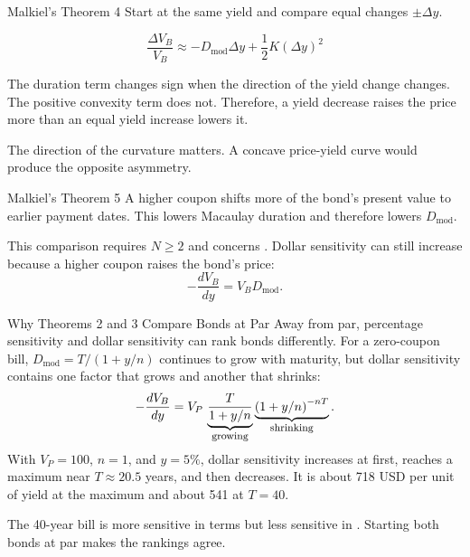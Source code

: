 \documentclass[aspectratio=169,11pt]{beamer}
\begin{document}
\begin{frame}{Malkiel's Theorem 4}
  \vspace{0.5em}
  Start at the same yield and compare equal changes $\pm\Delta y$.

  \vspace{0.5em}
  \[
    \frac{\Delta V_B}{V_B}\approx
    -D_{\mathrm{mod}}\Delta y+\frac{1}{2}K(\Delta y)^2
  \]

  \vspace{0.5em}
  The duration term changes sign when the direction of the yield change changes.
  The positive convexity term does not. Therefore, a yield decrease raises the
  price more than an equal yield increase lowers it.

  \vspace{0.5em}
  The direction of the curvature matters. A concave price-yield curve would
  produce the opposite asymmetry.
\end{frame}

\begin{frame}{Malkiel's Theorem 5}
  \vspace{0.5em}
  A higher coupon shifts more of the bond's present value to earlier payment
  dates. This lowers Macaulay duration and therefore lowers
  $D_{\mathrm{mod}}$.

  \vspace{0.8em}
  This comparison requires $N\ge2$ and concerns . Dollar sensitivity can still increase because a higher coupon
  raises the bond's price:
  \[
    -\frac{dV_B}{dy}=V_BD_{\mathrm{mod}}.
  \]

\end{frame}

\begin{frame}{Why Theorems 2 and 3 Compare Bonds at Par}
  \vspace{0.3em}
  Away from par, percentage sensitivity and dollar sensitivity can rank bonds
  differently. For a zero-coupon bill,
  $D_{\mathrm{mod}}=T/(1+y/n)$ continues to grow with maturity, but dollar
  sensitivity contains one factor that grows and another that shrinks:
  \[
    -\frac{dV_B}{dy}=V_P\,\underbrace{\frac{T}{1+y/n}}_{\text{\footnotesize growing}}
    \underbrace{\left(1+y/n\right)^{-nT}}_{\text{\footnotesize shrinking}} .
  \]
  With $V_P=100$, $n=1$, and $y=5\%$, dollar sensitivity increases at first,
  reaches a maximum near $T\approx20.5$ years, and then decreases. It is about
  718 USD per unit of yield at the maximum and about 541 at $T=40$.

  \vspace{0.3em}
  The 40-year bill is more sensitive in  terms but less
  sensitive in . Starting both bonds at par makes the rankings
  agree.

\end{frame}
\end{document}
